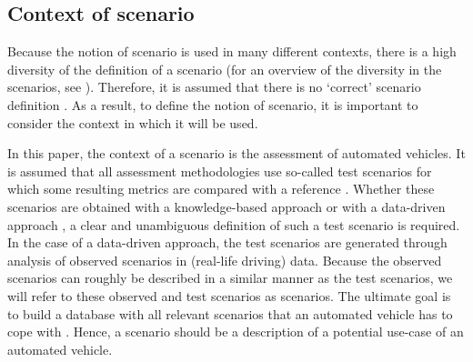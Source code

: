 \subsection{Context of scenario}
\label{sec:context}

Because the notion of scenario is used in many different contexts, there is a high diversity of the definition of a scenario (for an overview of the diversity in the scenarios, see \cite{vannotten2003updated, bishop2007scentechniques}). Therefore, it is assumed that there is no `correct' scenario definition \cite{vannotten2003updated}. As a result, to define the notion of scenario, it is important to consider the context in which it will be used.

In this paper, the context of a scenario is the assessment of automated vehicles. It is assumed that all assessment methodologies use so-called test scenarios for which some resulting metrics are compared with a reference \cite{stellet2015taxonomy}. Whether these scenarios are obtained with a knowledge-based approach \cite{bagschik2017ontology, stellet2015taxonomy} or with a data-driven approach \cite{deGelder2017assessment, stellet2015taxonomy}, a clear and unambiguous definition of such a test scenario is required. In the case of a data-driven approach, the test scenarios are generated through analysis of observed scenarios in (real-life driving) data. Because the observed scenarios can roughly be described in a similar manner as the test scenarios, we will refer to these observed and test scenarios as scenarios.
The ultimate goal is to build a database with all relevant scenarios that an automated vehicle has to cope with \cite{putz2017pegasus}. Hence, a scenario should be a description of a potential use-case of an automated vehicle. 
